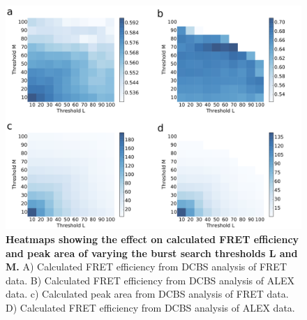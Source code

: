 \documentclass[10pt]{article}
\begin{document}
\begin{figure}[!ht]
   \begin{center}
      \includegraphics*[clip=true, width=6in]{heatmaps.pdf}
      \caption{{\bf Heatmaps showing the effect on calculated FRET efficiency and peak area of varying the burst search thresholds L and M.} A) Calculated FRET efficiency from DCBS analysis of FRET data. B) Calculated FRET efficiency from DCBS analysis of ALEX data. c) Calculated peak area from DCBS analysis of FRET data. D) Calculated FRET efficiency from DCBS analysis of ALEX data.}
      \label{fig:fig8_heatmaps}
   \end{center}
\end{figure}
\end{document}
